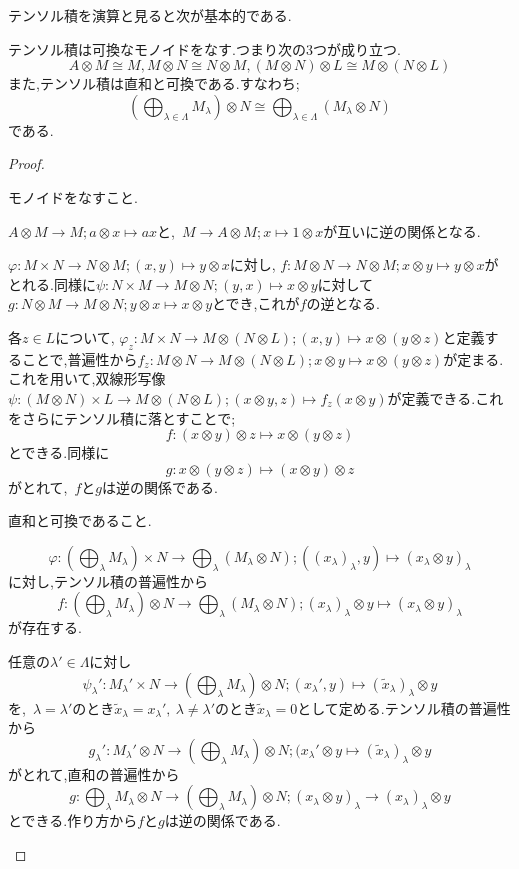 テンソル積を演算と見ると次が基本的である.
\begin{prop}
	テンソル積は可換なモノイドをなす.つまり次の3つが成り立つ.
	\[A\otimes M\cong M, M\otimes N\cong N\otimes M, (M\otimes N)\otimes L\cong M\otimes (N\otimes L)\]
	また,テンソル積は直和と可換である.すなわち;
	\[\left(\bigoplus_{\lambda\in\Lambda} M_\lambda\right)\otimes N\cong \bigoplus_{\lambda\in\Lambda}(M_\lambda\otimes N)\]
	である.
\end{prop}
\begin{proof}
	\begin{step}
		\item モノイドをなすこと.
	\begin{sakura}
		\item $A\otimes M\to M;a\otimes x\mapsto ax$と,~$M\to A\otimes M;x\mapsto 1\otimes x$が互いに逆の関係となる.
		\item $\varphi:M\times N\to N\otimes M;(x,y)\mapsto y\otimes x$に対し, $f:M\otimes N\to N\otimes M;x\otimes y\mapsto y\otimes x$がとれる.同様に$\psi:N\times M\to M\otimes N;(y,x)\mapsto x\otimes y$に対して$g:N\otimes M\to M\otimes N;y\otimes x\mapsto x\otimes y$とでき,これが$f$の逆となる.
		\item 各$z\in L$について, $\varphi_z:M\times N\to M\otimes(N\otimes L);(x,y)\mapsto x\otimes(y\otimes z)$と定義することで,普遍性から$f_z:M\otimes N\to M\otimes(N\otimes L);x\otimes y\mapsto x\otimes(y\otimes z)$が定まる.これを用いて,双線形写像$\psi:(M\otimes N)\times L\to M\otimes(N\otimes L);(x\otimes y,z)\mapsto f_z(x\otimes y)$が定義できる.これをさらにテンソル積に落とすことで;
		\[f:(x\otimes y)\otimes z\mapsto x\otimes(y\otimes z)\]
		とできる.同様に
		\[g:x\otimes (y\otimes z)\mapsto (x\otimes y)\otimes z\]
		がとれて,~$f$と$g$は逆の関係である.
	\end{sakura}
	\item 直和と可換であること.
	
	\begin{mrkw}
		\item \[\varphi:\left(\bigoplus_\lambda M_\lambda\right)\times N\to\bigoplus_\lambda(M_\lambda\otimes N);((x_\lambda)_\lambda,y)\mapsto(x_\lambda\otimes y)_\lambda\]
		に対し,テンソル積の普遍性から
		\[f:\left(\bigoplus_\lambda M_\lambda\right)\otimes N\to \bigoplus_\lambda(M_\lambda\otimes N);(x_\lambda)_\lambda\otimes y\mapsto(x_\lambda\otimes y)_\lambda\]
		が存在する.
		\item 任意の$\lambda'\in\Lambda$に対し
		\[\psi_\lambda':M_\lambda'\times N\to\left(\bigoplus_\lambda M_\lambda\right)\otimes N;(x_\lambda',y)\mapsto(\tilde{x}_\lambda)_\lambda\otimes y\]
		を,~$\lambda=\lambda'$のとき$\tilde{x}_\lambda=x_\lambda',~\lambda\neq\lambda'$のとき$\tilde{x}_\lambda=0$として定める.テンソル積の普遍性から
		\[g_\lambda':M_\lambda'\otimes N\to\left(\bigoplus_\lambda M_\lambda\right)\otimes N;(x_\lambda'\otimes y\mapsto(\tilde{x}_\lambda)_\lambda\otimes y\]
		がとれて,直和の普遍性から
		\[g:\bigoplus_\lambda M_\lambda\otimes N\to \left(\bigoplus_\lambda M_\lambda\right)\otimes N;(x_\lambda\otimes y)_\lambda\to(x_\lambda)_\lambda\otimes y\]
		とできる.作り方から$f$と$g$は逆の関係である.
	\end{mrkw}
	\end{step}
\end{proof}

